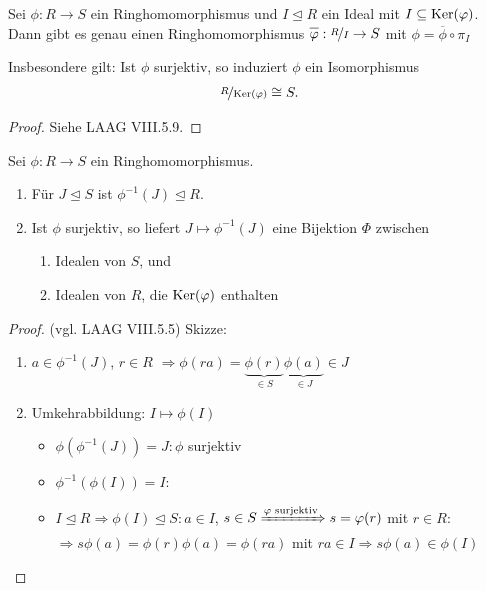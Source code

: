 \begin{proposition}[Homomorphiesatz]
	Sei $\phi: R \to S$ ein Ringhomomorphismus und $I \unlhd R$ ein Ideal mit $I \subseteq \Ker(\phi)$. Dann gibt es genau einen Ringhomomorphismus $\overline{\phi}:\lnkset{R}{I} \to S$ mit $\phi = \overline{\phi}\circ \pi_I$
		\begin{center}
	\end{center}
	Insbesondere gilt: Ist $\phi$ surjektiv, so induziert $\phi$ ein Isomorphismus
	\begin{align}
		\lnkset{R}{\Ker(\phi)} \cong S. \notag
	\end{align}
\end{proposition}
\begin{proof}
	Siehe LAAG VIII.5.9.
\end{proof}

\begin{lemma}
	Sei $\phi:R\to S$ ein Ringhomomorphismus.
	\begin{enumerate}[label=(\alph*)]
		\item Für $J \unlhd S$ ist $\phi^{-1}(J) \unlhd R$.
		\item Ist $\phi$ surjektiv, so liefert $J \mapsto \phi^{-1}(J)$ eine Bijektion $\Phi$ zwischen
		\begin{enumerate}
			\item Idealen von $S$, und
			\item Idealen von $R$, die $\Ker(\phi)$ enthalten
		\end{enumerate}
	\end{enumerate}
\end{lemma}
\begin{proof}
	(vgl. LAAG VIII.5.5) Skizze:
	\begin{enumerate}[label=(\alph*)]
		\item $a \in \phi^{-1}(J)$, $r \in R$ $\Rightarrow \phi(ra) = \underbrace{\phi(r)}_{\in S}\underbrace{\phi(a)}_{\in J}\in J$
		\item Umkehrabbildung: $I \mapsto \phi(I)$
		\begin{itemize}
			\item $\phi(\phi^{-1}(J))=J\colon \phi$ surjektiv
			\item $\phi^{-1}(\phi(I)) = I\colon$ 
			\item $I \unlhd R \Rightarrow \phi(I) \unlhd S: a \in I$, $s \in S \xRightarrow{\phi \text{ surjektiv}} s = \phi(r)$ mit $r \in R$:\\
			$\Rightarrow s \phi(a) = \phi(r)\phi(a) = \phi(ra)$ mit $ra \in I \Rightarrow s\phi(a) \in \phi(I)$
		\end{itemize}
	\end{enumerate}
\end{proof}

